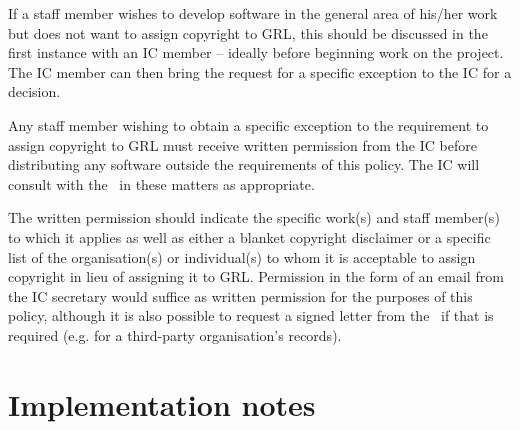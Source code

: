 \documentclass[10pt,a4paper]{article}
\begin{document}
\par If a staff member wishes to develop software in the general area of his/her work 
but does not want to assign copyright to GRL, this should be discussed in the first 
instance with an IC member -- ideally before beginning work on the project. The IC 
member can then bring the request for a specific exception to the IC for a decision. 

\par Any staff member wishing to obtain a specific exception to the requirement to 
assign copyright to GRL must receive written permission from the IC before 
distributing any software outside the requirements of this policy. The IC will consult 
with the \exectitle\ in these matters as appropriate. 

\par The written permission should indicate the specific work(s) and staff member(s) 
to which it applies as well as either a blanket copyright disclaimer or a specific list of 
the organisation(s) or individual(s) to whom it is acceptable to assign copyright in 
lieu of assigning it to GRL. Permission in the form of an email from the IC secretary 
would suffice as written permission for the purposes of this policy, although it is also 
possible to request a signed letter from the \exectitle\ if that is required (e.g. for a 
third-party organisation's records). 





\section{Implementation notes}
\label{section:impnotes}

\end{document}
